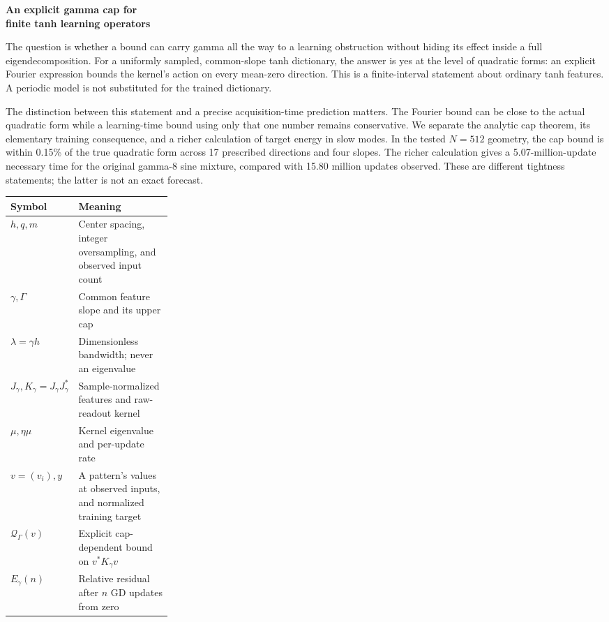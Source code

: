 \documentclass[11pt]{article}
\theoremstyle{definition}
\begin{document}
\thispagestyle{plain}
{\color{ink}\fontsize{23}{26}\selectfont\bfseries
An explicit gamma cap for\\finite tanh learning operators\par}
\vspace{8pt}
The question is whether a bound can carry gamma all the way to a learning
obstruction without hiding its effect inside a full eigendecomposition.
For a uniformly sampled, common-slope tanh dictionary, the answer is yes
at the level of quadratic forms: an explicit Fourier expression bounds
the kernel's action on every mean-zero direction. This is a finite-interval
statement about ordinary tanh features. A periodic model is not substituted
for the trained dictionary.

The distinction between this statement and a precise acquisition-time
prediction matters. The Fourier bound can be close to the actual quadratic
form while a learning-time bound using only that one number remains
conservative. We separate the analytic cap theorem, its elementary training
consequence, and a richer calculation of target energy in slow modes.
In the tested $N=512$ geometry, the cap bound is within 0.15\% of the true
quadratic form across 17 prescribed directions and four slopes. The richer
calculation gives a 5.07-million-update necessary time for the original
gamma-8 sine mixture, compared with 15.80 million updates observed.
These are different tightness statements; the latter is not an exact forecast.

\begin{center}\small
\begin{tabularx}{\linewidth}{@{}p{0.27\linewidth}X@{}}
\hline
Symbol & Meaning\\\hline
$h,q,m$ & Center spacing, integer oversampling, and observed input count\\
$\gamma,\Gamma$ & Common feature slope and its upper cap\\
$\lambda=\gamma h$ & Dimensionless bandwidth; never an eigenvalue\\
$J_\gamma,K_\gamma=J_\gamma J_\gamma^*$ & Sample-normalized features and raw-readout kernel\\
$\mu,\eta\mu$ & Kernel eigenvalue and per-update rate\\
$v=(v_i),y$ & A pattern's values at observed inputs, and normalized training target\\
$\mathcal Q_\Gamma(v)$ & Explicit cap-dependent bound on $v^*K_\gamma v$\\
$E_\gamma(n)$ & Relative residual after $n$ GD updates from zero\\\hline
\end{tabularx}
\end{center}
\end{document}

